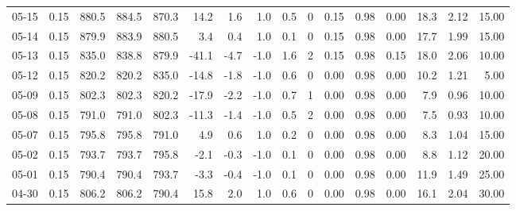 \begin{threeparttable}
{\begin{tabular}{lrrrrrrrrrrrrrrr}
  05-15 &     0.15 & 880.5 & 884.5 & 870.3 &       14.2 &            1.6 &                      1.0 &                 0.5 &              0 &       0.15 &      0.98 &           0.00 &             18.3 &            2.12 &                  15.00 \\
  05-14 &     0.15 & 879.9 & 883.9 & 880.5 &        3.4 &            0.4 &                      1.0 &                 0.1 &              0 &       0.15 &      0.98 &           0.00 &             17.7 &            1.99 &                  15.00 \\
  05-13 &     0.15 & 835.0 & 838.8 & 879.9 &      -41.1 &           -4.7 &                     -1.0 &                 1.6 &              2 &       0.15 &      0.98 &           0.15 &             18.0 &            2.06 &                  10.00 \\
  05-12 &     0.15 & 820.2 & 820.2 & 835.0 &      -14.8 &           -1.8 &                     -1.0 &                 0.6 &              0 &       0.00 &      0.98 &           0.00 &             10.2 &            1.21 &                   5.00 \\
  05-09 &     0.15 & 802.3 & 802.3 & 820.2 &      -17.9 &           -2.2 &                     -1.0 &                 0.7 &              1 &       0.00 &      0.98 &           0.00 &              7.9 &            0.96 &                  10.00 \\
  05-08 &     0.15 & 791.0 & 791.0 & 802.3 &      -11.3 &           -1.4 &                     -1.0 &                 0.5 &              2 &       0.00 &      0.98 &           0.00 &              7.5 &            0.93 &                  10.00 \\
  05-07 &     0.15 & 795.8 & 795.8 & 791.0 &        4.9 &            0.6 &                      1.0 &                 0.2 &              0 &       0.00 &      0.98 &           0.00 &              8.3 &            1.04 &                  15.00 \\
  05-02 &     0.15 & 793.7 & 793.7 & 795.8 &       -2.1 &           -0.3 &                     -1.0 &                 0.1 &              0 &       0.00 &      0.98 &           0.00 &              8.8 &            1.12 &                  20.00 \\
  05-01 &     0.15 & 790.4 & 790.4 & 793.7 &       -3.3 &           -0.4 &                     -1.0 &                 0.1 &              0 &       0.00 &      0.98 &           0.00 &             11.9 &            1.49 &                  25.00 \\
  04-30 &     0.15 & 806.2 & 806.2 & 790.4 &       15.8 &            2.0 &                      1.0 &                 0.6 &              0 &       0.00 &      0.98 &           0.00 &             16.1 &            2.04 &                  30.00 \\

\end{tabular}}
\end{threeparttable}
